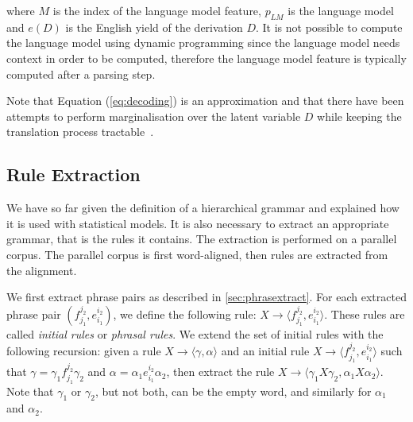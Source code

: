     \noindent where $M$ is the index of the language model feature, $p_{LM}$ is the language model and $e(D)$ is the English
    yield of the derivation $D$. It is not possible to compute the language model using dynamic programming since
    the language model needs context in order to be computed, therefore the language model feature is typically
    computed after a parsing step.
    
    Note that Equation (\ref{eq:decoding}) is an approximation and that there have been attempts to perform marginalisation over the latent variable 
    $D$ while keeping the translation process tractable~\citep{blunsom-cohn-osborne:2008:ACL}.


  \subsection{Rule Extraction} \label{sec:hierruleextract}

  We have so far given the definition of a hierarchical grammar and explained how it is used with statistical models.
  It is also necessary to extract an appropriate grammar, that is the rules it contains. The extraction
  is performed on a parallel corpus. The parallel corpus is first word-aligned, then
  rules are extracted from the alignment.

  We first extract phrase pairs as described in \autoref{sec:phrasextract}.
  For each extracted phrase pair $(f_{j_1}^{j_2}, e_{i_1}^{i_2})$,
  we define the following
  rule: $X \rightarrow \langle f_{j_1}^{j_2},e_{i_1}^{i_2} \rangle$.
  These rules are called {\em initial rules} or {\em phrasal rules}.
      We extend the set of initial rules with the following recursion: given a rule  $X \rightarrow \langle \gamma, \alpha \rangle$
      and an initial rule $X \rightarrow \langle f_{j_1}^{j_2},e_{i_1}^{i_2} \rangle$ such that $\gamma = \gamma_1 f_{j_1}^{j_2} \gamma_2$
      and $\alpha = \alpha_1 e_{i_1}^{i_2} \alpha_2$, then extract the rule $X \rightarrow \langle \gamma_1 X \gamma_2, \alpha_1 X \alpha_2 \rangle$.
      Note that $\gamma_1$ or $\gamma_2$, but not both, can be the empty word, and similarly for $\alpha_1$ and $\alpha_2$.

%
%
%

